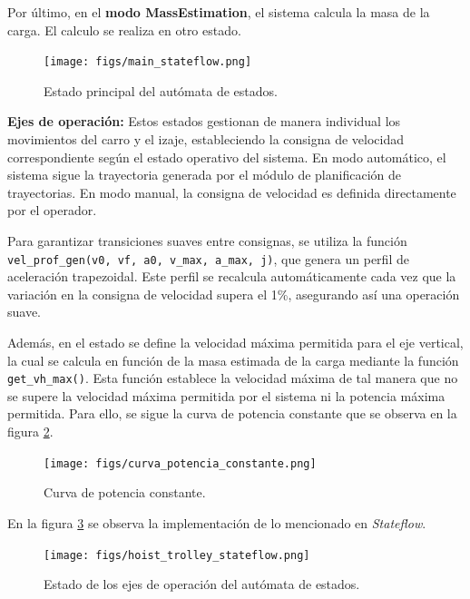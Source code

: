 \documentclass{article}
\begin{document}
            Por último, en el \textbf{modo MassEstimation}, el sistema calcula la masa de la carga. El calculo se realiza en otro estado.

        
            \begin{figure} [H]
                \centering
                \texttt{[image: figs/main\_stateflow.png]}
                \caption{Estado principal del autómata de estados.}
                \label{fig:main_stateflow}
            \end{figure}

        \textbf{Ejes de operación:}
            Estos estados gestionan de manera individual los movimientos del carro y el izaje, estableciendo la consigna de velocidad correspondiente según el estado operativo del sistema. En modo automático, el sistema sigue la trayectoria generada por el módulo de planificación de trayectorias. En modo manual, la consigna de velocidad es definida directamente por el operador.

            Para garantizar transiciones suaves entre consignas, se utiliza la función \texttt{vel\_prof\_gen(v0, vf, a0, v\_max, a\_max, j)}, que genera un perfil de aceleración trapezoidal. Este perfil se recalcula automáticamente cada vez que la variación en la consigna de velocidad supera el 1\%, asegurando así una operación suave.

            Además, en el estado se define la velocidad máxima permitida para el eje vertical, la cual se calcula en función de la masa estimada de la carga mediante la función \texttt{get\_vh\_max()}. Esta función establece la velocidad máxima de tal manera que no se supere la velocidad máxima permitida por el sistema ni la potencia máxima permitida. Para ello, se sigue la curva de potencia constante que se observa en la figura \ref{fig:potencia_constante}.

            \begin{figure}[H]
                \centering
                \texttt{[image: figs/curva\_potencia\_constante.png]}
                \caption{Curva de potencia constante.}
                \label{fig:potencia_constante}
            \end{figure}

            En la figura \ref{fig:operation_axes_stateflow} se observa la implementación de lo mencionado en \textit{Stateflow}.

            \begin{figure} [H]
                \centering
                \texttt{[image: figs/hoist\_trolley\_stateflow.png]}
                \caption{Estado de los ejes de operación del autómata de estados.}
                \label{fig:operation_axes_stateflow}
            \end{figure}
\end{document}
